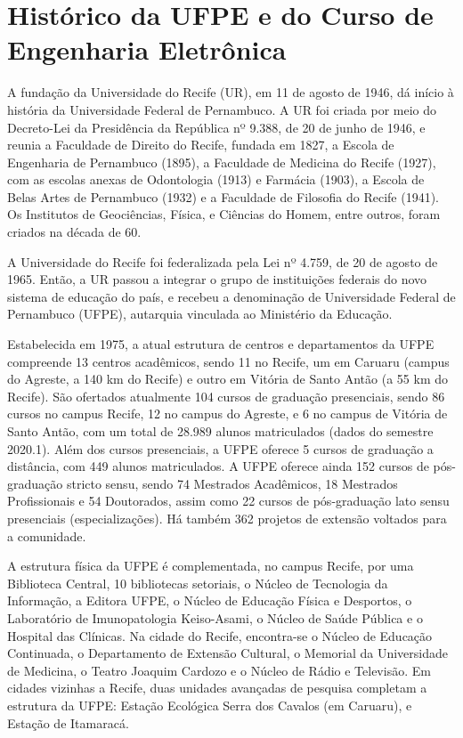 \chapter{Histórico da UFPE e do Curso de Engenharia Eletrônica}
\label{cap:um}

A fundação da Universidade do Recife (UR), em 11 de agosto de 1946, dá início à história da Universidade Federal de Pernambuco. A UR foi criada por meio do Decreto-Lei da Presidência da República nº 9.388, de 20 de junho de 1946, e reunia a Faculdade de Direito do Recife, fundada em 1827, a Escola de Engenharia de Pernambuco (1895), a Faculdade de Medicina do Recife (1927), com as escolas anexas de Odontologia (1913) e Farmácia (1903), a Escola de Belas Artes de Pernambuco (1932) e a Faculdade de Filosofia do Recife (1941). Os Institutos de Geociências, Física, e Ciências do Homem, entre outros, foram criados na década de 60.

A Universidade do Recife foi federalizada pela Lei nº 4.759, de 20 de agosto de 1965. Então, a UR passou a integrar o grupo de instituições federais do novo sistema de educação do país, e recebeu a denominação de Universidade Federal de Pernambuco (UFPE), autarquia vinculada ao Ministério da Educação.

Estabelecida em 1975, a atual estrutura de centros e departamentos da UFPE compreende 13 centros acadêmicos, sendo 11 no Recife, um em Caruaru (campus do Agreste, a 140 km do Recife) e outro em Vitória de Santo Antão (a 55 km do Recife). São ofertados atualmente 104 cursos de graduação presenciais, sendo 86 cursos no campus Recife, 12 no campus do Agreste, e 6 no campus de Vitória de Santo Antão, com um total de 28.989 alunos matriculados (dados do semestre 2020.1). Além dos cursos presenciais, a UFPE oferece 5 cursos de graduação a distância, com 449 alunos matriculados. A UFPE oferece ainda 152 cursos de pós-graduação stricto sensu, sendo 74 Mestrados Acadêmicos, 18 Mestrados Profissionais e 54 Doutorados, assim como 22 cursos de pós-graduação lato sensu presenciais (especializações). Há também 362 projetos de extensão voltados para a comunidade.

A estrutura física da UFPE é complementada, no campus Recife, por uma Biblioteca Central, 10 bibliotecas setoriais, o Núcleo de Tecnologia da Informação, a Editora UFPE, o Núcleo de Educação Física e Desportos, o Laboratório de Imunopatologia Keiso-Asami, o Núcleo de Saúde Pública e o Hospital das Clínicas. Na cidade do Recife, encontra-se o Núcleo de Educação Continuada, o Departamento de Extensão Cultural, o Memorial da Universidade de Medicina, o Teatro Joaquim Cardozo e o Núcleo de Rádio e Televisão. Em cidades vizinhas a Recife, duas unidades avançadas de pesquisa completam a estrutura da UFPE: Estação Ecológica Serra dos Cavalos (em Caruaru), e Estação de Itamaracá.

